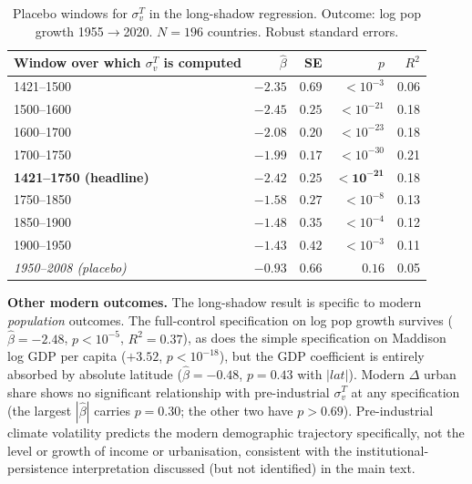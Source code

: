 \documentclass[11pt,letterpaper]{article}
\begin{document}
\begin{table}[H]
\centering
\caption{Placebo windows for $\sigma_v^T$ in the long-shadow regression. Outcome: log pop growth 1955$\to$2020. $N = 196$ countries. Robust standard errors.}
\label{tab:placebo-window}
\small
\begin{tabular}{lrrrr}
\toprule
Window over which $\sigma_v^T$ is computed & $\hat\beta$ & SE & $p$ & $R^2$ \\
\midrule
1421--1500                                  & $-2.35$ & $0.69$ & $<10^{-3}$  & 0.06 \\
1500--1600                                  & $-2.45$ & $0.25$ & $<10^{-21}$ & 0.18 \\
1600--1700                                  & $-2.08$ & $0.20$ & $<10^{-23}$ & 0.18 \\
1700--1750                                  & $-1.99$ & $0.17$ & $<10^{-30}$ & 0.21 \\
\textbf{1421--1750 (headline)}              & $\mathbf{-2.42}$ & $\mathbf{0.25}$ & $\mathbf{<10^{-21}}$ & 0.18 \\
1750--1850                                  & $-1.58$ & $0.27$ & $<10^{-8}$  & 0.13 \\
1850--1900                                  & $-1.48$ & $0.35$ & $<10^{-4}$  & 0.12 \\
1900--1950                                  & $-1.43$ & $0.42$ & $<10^{-3}$  & 0.11 \\
\textit{1950--2008 (placebo)}               & \textit{$-0.93$} & \textit{$0.66$} & \textit{$0.16$} & 0.05 \\
\bottomrule
\end{tabular}
\end{table}

\textbf{Other modern outcomes.} The long-shadow result is specific to modern \emph{population} outcomes. The full-control specification on log pop growth survives ($\hat\beta = -2.48$, $p < 10^{-5}$, $R^2 = 0.37$), as does the simple specification on Maddison log GDP per capita ($+3.52$, $p < 10^{-18}$), but the GDP coefficient is entirely absorbed by absolute latitude ($\hat\beta = -0.48$, $p = 0.43$ with $|lat|$). Modern $\Delta$ urban share shows no significant relationship with pre-industrial $\sigma_v^T$ at any specification (the largest $|\hat\beta|$ carries $p=0.30$; the other two have $p>0.69$). Pre-industrial climate volatility predicts the modern demographic trajectory specifically, not the level or growth of income or urbanisation, consistent with the institutional-persistence interpretation discussed (but not identified) in the main text.
\end{document}
